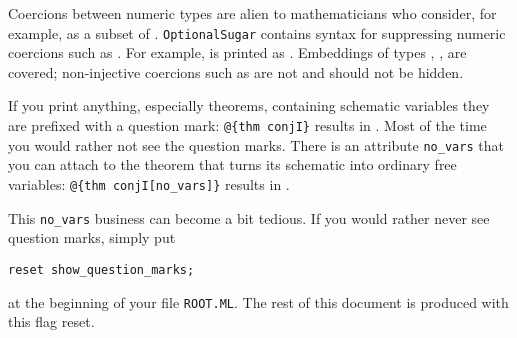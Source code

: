 \begin{isabellebody}
\begin{isamarkuptext}
\begin{itemize}
\end{itemize}%
\end{isamarkuptext}%
\isamarkuptrue%
%
\isamarkuptrue%
%
\begin{isamarkuptext}%
Coercions between numeric types are alien to mathematicians who
consider, for example,  as a subset of .
\texttt{OptionalSugar} contains syntax for suppressing numeric coercions such
as  \isa{{\isacharcolon}{\isacharcolon}} . For example,
 is printed as . Embeddings of types
, ,  are covered; non-injective coercions such
as  \isa{{\isacharcolon}{\isacharcolon}}  are not and should not be
hidden.%
\end{isamarkuptext}%
\isamarkuptrue%
%
\isamarkuptrue%
%
\isamarkuptrue%
%
\begin{isamarkuptext}%
If you print anything, especially theorems, containing
schematic variables they are prefixed with a question mark:
\verb!@!\verb!{thm conjI}! results in . Most of the time
you would rather not see the question marks. There is an attribute
\verb!no_vars! that you can attach to the theorem that turns its
schematic into ordinary free variables: \verb!@!\verb!{thm conjI[no_vars]}!
results in .

This \verb!no_vars! business can become a bit tedious.
If you would rather never see question marks, simply put
\begin{verbatim}
reset show_question_marks;
\end{verbatim}
at the beginning of your file \texttt{ROOT.ML}.
The rest of this document is produced with this flag reset.


\end{isamarkuptext}
\end{isabellebody}
